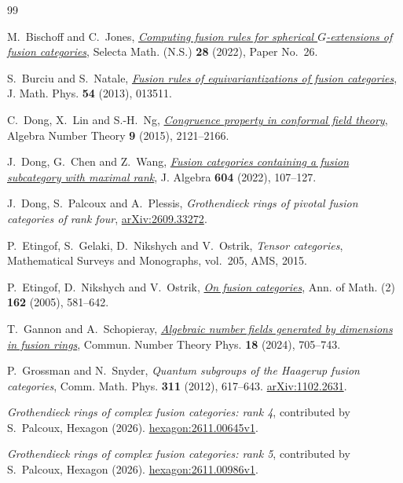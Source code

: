 \documentclass[11pt,reqno]{amsart}
\theoremstyle{remark}\newtheorem{remark}[theorem]{Remark}
\numberwithin{equation}{section}
\begin{document}
\begin{thebibliography}{99}

 M.~Bischoff and C.~Jones, \href{https://doi.org/10.1007/s00029-021-00725-3}{\emph{Computing fusion rules for spherical $G$-extensions of fusion categories}}, Selecta Math. (N.S.) \textbf{28} (2022), Paper No.~26.

 S.~Burciu and S.~Natale, \href{https://doi.org/10.1063/1.4774293}{\emph{Fusion rules of equivariantizations of fusion categories}}, J. Math. Phys. \textbf{54} (2013), 013511.

 C.~Dong, X.~Lin and S.-H.~Ng, \href{https://doi.org/10.2140/ant.2015.9.2121}{\emph{Congruence property in conformal field theory}}, Algebra Number Theory \textbf{9} (2015), 2121--2166.

 J.~Dong, G.~Chen and Z.~Wang, \href{https://doi.org/10.1016/j.jalgebra.2022.02.020}{\emph{Fusion categories containing a fusion subcategory with maximal rank}}, J. Algebra \textbf{604} (2022), 107--127.

 J.~Dong, S.~Palcoux and A.~Plessis, \emph{Grothendieck rings of pivotal fusion categories of rank four}, \href{https://arxiv.org/abs/2609.33272}{arXiv:2609.33272}.

 P.~Etingof, S.~Gelaki, D.~Nikshych and V.~Ostrik, \emph{Tensor categories}, Mathematical Surveys and Monographs, vol.~205, AMS, 2015.

 P.~Etingof, D.~Nikshych and V.~Ostrik, \href{https://doi.org/10.4007/annals.2005.162.581}{\emph{On fusion categories}}, Ann. of Math. (2) \textbf{162} (2005), 581--642.

 T.~Gannon and A.~Schopieray, \href{https://doi.org/10.4310/CNTP.241202233757}{\emph{Algebraic number fields generated by dimensions in fusion rings}}, Commun. Number Theory Phys. \textbf{18} (2024), 705--743.

 P.~Grossman and N.~Snyder, \emph{Quantum subgroups of the Haagerup fusion categories}, Comm. Math. Phys. \textbf{311} (2012), 617--643. \href{https://arxiv.org/abs/1102.2631}{arXiv:1102.2631}.

 \emph{Grothendieck rings of complex fusion categories: rank 4}, contributed by S.~Palcoux, Hexagon (2026). \href{https://hexagonmath.org/2611.00645v1}{hexagon:2611.00645v1}.

 \emph{Grothendieck rings of complex fusion categories: rank 5}, contributed by S.~Palcoux, Hexagon (2026). \href{https://hexagonmath.org/2611.00986v1}{hexagon:2611.00986v1}.


\end{thebibliography}
\end{document}
